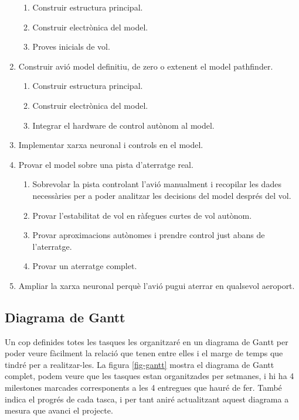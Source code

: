 \documentclass[10pt,a4paper,twocolumn,twoside]{article}
\begin{document}
\begin{enumerate}
\begin{enumerate}[label*=\arabic*.]
        \item Construir estructura principal.
        \item Construir electrònica del model.
        \item Proves inicials de vol.
    \end{enumerate}
    \item Construir avió model definitiu, de zero o extenent el model pathfinder.
    \begin{enumerate}[label*=\arabic*.]
        \item Construir estructura principal.
        \item Construir electrònica del model.
        \item Integrar el hardware de control autònom al model.
    \end{enumerate}
    \item Implementar xarxa neuronal i controls en el model.
    \item Provar el model sobre una pista d'aterratge real.
    \begin{enumerate}[label*=\arabic*.]
        \item Sobrevolar la pista controlant l'avió manualment i recopilar les dades necessàries per a poder analitzar les decisions del model després del vol.
        \item Provar l'estabilitat de vol en ràfegues curtes de vol autònom.
        \item Provar aproximacions autònomes i prendre control just abans de l'aterratge.
        \item Provar un aterratge complet.
    \end{enumerate}
    \item Ampliar la xarxa neuronal perquè l'avió pugui aterrar en qualsevol aeroport.
\end{enumerate}

\subsection{Diagrama de Gantt}

Un cop definides totes les tasques les organitzaré en un diagrama de Gantt \cite{Gantt} per poder veure fàcilment la relació que tenen entre elles i el marge de temps que tindré per a realitzar-les.  La figura \ref{fig-gantt} mostra el diagrama de Gantt complet, podem veure que les tasques estan organitzades per setmanes, i hi ha 4 milestones marcades corresponents a les 4 entregues que hauré de fer. També indica el progrés de cada tasca, i per tant aniré actualitzant aquest diagrama a mesura que avanci el projecte.
\end{document}

